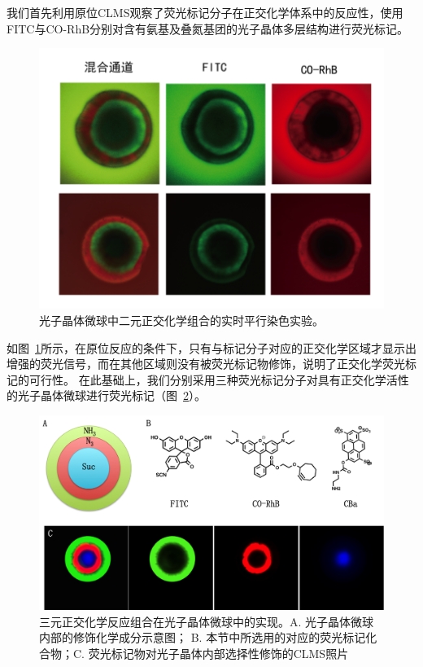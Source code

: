 我们首先利用原位CLMS观察了荧光标记分子在正交化学体系中的反应性，使用FITC与CO-RhB分别对含有氨基及叠氮基团的光子晶体多层结构进行荧光标记。
\begin{figure}[htbp]
  \centering
  \includegraphics[width=\linewidth]{figures/ch5/livestaining.png}
  \caption{光子晶体微球中二元正交化学组合的实时平行染色实验。}
  \label{fig:livestaining}
\end{figure}
如图~\ref{fig:livestaining}所示，在原位反应的条件下，只有与标记分子对应的正交化学区域才显示出增强的荧光信号，而在其他区域则没有被荧光标记物修饰，说明了正交化学荧光标记的可行性。
在此基础上，我们分别采用三种荧光标记分子对具有正交化学活性的光子晶体微球进行荧光标记（图~\ref{fig:tristain}）。
\begin{figure}[htbp]
  \centering
  \includegraphics[width=\linewidth]{figures/ch5/Tristain.png}
  \caption{三元正交化学反应组合在光子晶体微球中的实现。A. 光子晶体微球内部的修饰化学成分示意图； B. 本节中所选用的对应的荧光标记化合物；C. 荧光标记物对光子晶体内部选择性修饰的CLMS照片}
  \label{fig:tristain}
\end{figure}


